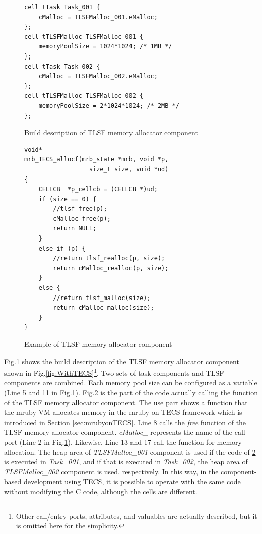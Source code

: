 \documentclass[JIP]{ipsj_v2/UTF8/ipsj}
\begin{document}
\begin{figure}[t]
\centering
\begin{lstlisting}
cell tTask Task_001 {
    cMalloc = TLSFMalloc_001.eMalloc;
};
cell tTLSFMalloc TLSFMalloc_001 {
    memoryPoolSize = 1024*1024; /* 1MB */
};
cell tTask Task_002 {
    cMalloc = TLSFMalloc_002.eMalloc;
};
cell tTLSFMalloc TLSFMalloc_002 {
    memoryPoolSize = 2*1024*1024; /* 2MB */
};
\end{lstlisting}
\caption{Build description of TLSF memory allocator component}
\label{src:TLSFBuild}
\end{figure}


\begin{figure}[t]
\centering
\begin{lstlisting}
void*
mrb_TECS_allocf(mrb_state *mrb, void *p, 
                  size_t size, void *ud)
{
    CELLCB	*p_cellcb = (CELLCB *)ud;
    if (size == 0) {
        //tlsf_free(p);
        cMalloc_free(p);
        return NULL;
    }
    else if (p) {
        //return tlsf_realloc(p, size);
        return cMalloc_realloc(p, size);
    }
    else {
        //return tlsf_malloc(size);
        return cMalloc_malloc(size);
    }
}
\end{lstlisting}
\caption{Example of TLSF memory allocator component}  
\label{src:TLSFC}
\end{figure}

Fig.\ref{src:TLSFBuild} shows the build description of the TLSF memory allocator component shown in Fig.\ref{fig:WithTECS}\footnote{Other call/entry ports, attributes, and valuables are actually described, but it is omitted here for the simplicity.}.
Two sets of task components and TLSF components are combined.
Each memory pool size can be configured as a variable (Line 5 and 11 in Fig.\ref{src:TLSFBuild}).
Fig.\ref{src:TLSFC} is the part of the code actually calling the function of the TLSF memory allocator component.
The use part shows a function that the mruby VM allocates memory in the mruby on TECS framework\cite{par:mrubyonTECS}\cite{par:mrubyonTECS3} which is introduced in Section \ref{sec:mrubyonTECS}.
Line 8 calls the {\it free} function of the TLSF memory allocator component.
{\it cMalloc\_} represents the name of the call port (Line 2 in Fig.\ref{src:TLSFBuild}).
Likewise, Line 13 and 17 call the function for memory allocation.
The heap area of {\it TLSFMalloc\_001} component is used if the code of \ref{src:TLSFC} is executed in {\it Task\_001}, and if that is executed in {\it Task\_002}, the heap area of {\it TLSFMalloc\_002} component is used, respectively.
In this way, in the component-based development using TECS, it is possible to operate with the same code without modifying the C code, although the cells are different.
\end{document}
